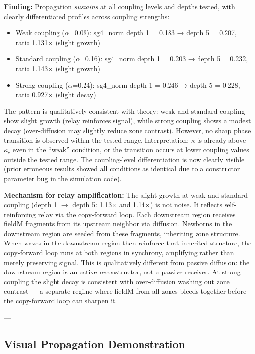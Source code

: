\documentclass[11pt]{article}
\begin{document}
\textbf{Finding:} Propagation \emph{sustains} at all coupling levels and depths tested, with clearly differentiated profiles across coupling strengths:
\begin{itemize}
  \item Weak coupling ($\alpha$=0.08): sg4\_norm depth 1 = 0.183 → depth 5 = 0.207, ratio 1.131× (slight growth)
  \item Standard coupling ($\alpha$=0.16): sg4\_norm depth 1 = 0.203 → depth 5 = 0.232, ratio 1.143× (slight growth)
  \item Strong coupling ($\alpha$=0.24): sg4\_norm depth 1 = 0.246 → depth 5 = 0.228, ratio 0.927× (slight decay)
\end{itemize}

The pattern is qualitatively consistent with theory: weak and standard coupling show slight growth (relay reinforces signal), while strong coupling shows a modest decay (over-diffusion may slightly reduce zone contrast). However, no sharp phase transition is observed within the tested range. Interpretation: $\kappa$ is already above $\kappa_c$ even in the ``weak'' condition, or the transition occurs at lower coupling values outside the tested range. The coupling-level differentiation is now clearly visible (prior erroneous results showed all conditions as identical due to a constructor parameter bug in the simulation code).

\textbf{Mechanism for relay amplification:} The slight growth at weak and standard coupling (depth 1 $\to$ depth 5: 1.13× and 1.14×) is not noise. It reflects self-reinforcing relay via the copy-forward loop. Each downstream region receives fieldM fragments from its upstream neighbor via diffusion. Newborns in the downstream region are seeded from these fragments, inheriting zone structure. When waves in the downstream region then reinforce that inherited structure, the copy-forward loop runs at both regions in synchrony, amplifying rather than merely preserving signal. This is qualitatively different from passive diffusion: the downstream region is an active reconstructor, not a passive receiver. At strong coupling the slight decay is consistent with over-diffusion washing out zone contrast --- a separate regime where fieldM from all zones bleeds together before the copy-forward loop can sharpen it.

---

\subsection{Visual Propagation Demonstration}
\end{document}
